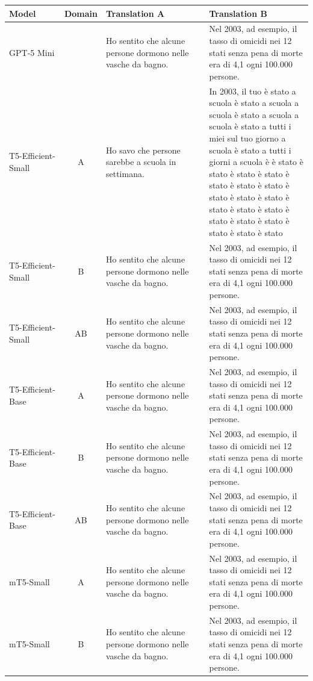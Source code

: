 \documentclass[pdflatex,sn-mathphys-num]{sn-jnl}%
\theoremstyle{thmstyleone}%
\theoremstyle{thmstyletwo}%
\theoremstyle{thmstylethree}%
\begin{document}
\begin{table}[htbp]
	\centering
	\renewcommand{\arraystretch}{1.3}
	\begin{tabular}{p{0.2\linewidth} c p{0.4\linewidth} p{0.4\linewidth}}
		\hline
		\textbf{Model} & \textbf{Domain} & \textbf{Translation A} & \textbf{Translation B} \\
		\hline
		GPT-5 Mini & & Ho sentito che alcune persone dormono nelle vasche da bagno. & Nel 2003, ad esempio, il tasso di omicidi nei 12 stati senza pena di morte era di 4,1 ogni 100.000 persone. \\
		T5-Efficient-Small & A & Ho savo che persone sarebbe a scuola in settimana. & In 2003, il tuo è stato a scuola è stato a scuola a scuola è stato a scuola a scuola è stato a tutti i miei sul tuo giorno a scuola è stato a tutti i giorni a scuola è è stato è stato è stato è stato è stato è stato è stato è stato è stato è stato è stato è stato è stato è stato è stato è stato è stato è stato è stato \\
		T5-Efficient-Small & B & Ho sentito che alcune persone dormono nelle vasche da bagno. & Nel 2003, ad esempio, il tasso di omicidi nei 12 stati senza pena di morte era di 4,1 ogni 100.000 persone. \\
		T5-Efficient-Small & AB & Ho sentito che alcune persone dormono nelle vasche da bagno. & Nel 2003, ad esempio, il tasso di omicidi nei 12 stati senza pena di morte era di 4,1 ogni 100.000 persone. \\
		T5-Efficient-Base & A & Ho sentito che alcune persone dormono nelle vasche da bagno. & Nel 2003, ad esempio, il tasso di omicidi nei 12 stati senza pena di morte era di 4,1 ogni 100.000 persone. \\
		T5-Efficient-Base & B & Ho sentito che alcune persone dormono nelle vasche da bagno. & Nel 2003, ad esempio, il tasso di omicidi nei 12 stati senza pena di morte era di 4,1 ogni 100.000 persone. \\
		T5-Efficient-Base & AB & Ho sentito che alcune persone dormono nelle vasche da bagno. & Nel 2003, ad esempio, il tasso di omicidi nei 12 stati senza pena di morte era di 4,1 ogni 100.000 persone. \\
		mT5-Small & A & Ho sentito che alcune persone dormono nelle vasche da bagno. & Nel 2003, ad esempio, il tasso di omicidi nei 12 stati senza pena di morte era di 4,1 ogni 100.000 persone. \\
		mT5-Small & B & Ho sentito che alcune persone dormono nelle vasche da bagno. & Nel 2003, ad esempio, il tasso di omicidi nei 12 stati senza pena di morte era di 4,1 ogni 100.000 persone. \\

\end{tabular}
\end{table}
\end{document}
